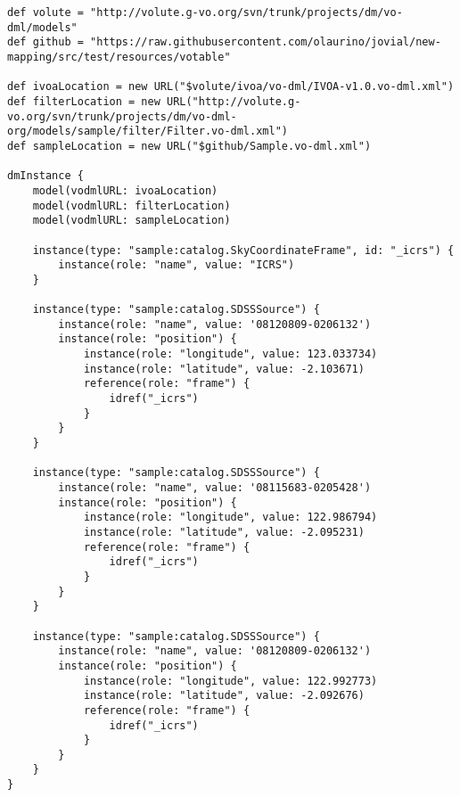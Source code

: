 \documentclass[11pt,a4paper]{ivoa}
\begin{document}
\begin{lstlisting}[label=lst:direct_sources,caption=Direct Source mapping,frame=tb]
def volute = "http://volute.g-vo.org/svn/trunk/projects/dm/vo-dml/models"
def github = "https://raw.githubusercontent.com/olaurino/jovial/new-mapping/src/test/resources/votable"

def ivoaLocation = new URL("$volute/ivoa/vo-dml/IVOA-v1.0.vo-dml.xml")
def filterLocation = new URL("http://volute.g-vo.org/svn/trunk/projects/dm/vo-dml-org/models/sample/filter/Filter.vo-dml.xml")
def sampleLocation = new URL("$github/Sample.vo-dml.xml")

dmInstance {
    model(vodmlURL: ivoaLocation)
    model(vodmlURL: filterLocation)
    model(vodmlURL: sampleLocation)

    instance(type: "sample:catalog.SkyCoordinateFrame", id: "_icrs") {
        instance(role: "name", value: "ICRS")
    }

    instance(type: "sample:catalog.SDSSSource") {
        instance(role: "name", value: '08120809-0206132')
        instance(role: "position") {
            instance(role: "longitude", value: 123.033734)
            instance(role: "latitude", value: -2.103671)
            reference(role: "frame") {
                idref("_icrs")
            }
        }
    }

    instance(type: "sample:catalog.SDSSSource") {
        instance(role: "name", value: '08115683-0205428')
        instance(role: "position") {
            instance(role: "longitude", value: 122.986794)
            instance(role: "latitude", value: -2.095231)
            reference(role: "frame") {
                idref("_icrs")
            }
        }
    }

    instance(type: "sample:catalog.SDSSSource") {
        instance(role: "name", value: '08120809-0206132')
        instance(role: "position") {
            instance(role: "longitude", value: 122.992773)
            instance(role: "latitude", value: -2.092676)
            reference(role: "frame") {
                idref("_icrs")
            }
        }
    }
}

\end{lstlisting}
\end{document}

